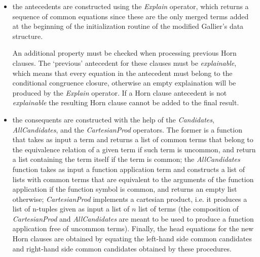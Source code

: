 \begin{itemize}
  \item the antecedents are constructed using the \emph{Explain} operator, 
    which returns a sequence of common equations since these are the 
    only merged terms added at the beginning of the initialization 
    routine of the modified Gallier's data structure.

    An additional property must be checked when processing previous
    Horn clauses. The `previous' antecedent for these clauses must be \emph{explainable},
    which means that every equation in the antecedent must belong to the conditional
    congruence closure, otherwise an empty explaination will be produced by the
    \emph{Explain} operator. If a Horn clause antecedent is not \emph{explainable}
    the resulting Horn clause cannot be added to the final result.

  \item the consequents are constructed with the help of the \emph{Candidates},
    \emph{AllCandidates}, and the \emph{CartesianProd} operators. 
    The former is a function that takes as input
    a term and returns a list of common terms
    that belong to the equivalence relation of a given term if such term is uncommon,
    and return a list containing the term itself if the term is common; the 
    \emph{AllCandidates} function takes as input a function application term and
    constructs a list of lists with common terms that are equivalent to the arguments
    of the function application if the function symbol is common, and returns an empty
    list otherwise; \emph{CartesianProd} implements a cartesian product, i.e. it 
    produces a list of n-tuples given as input a list of $n$ list of terms (the 
      composition of \emph{CartesianProd} and \emph{AllCandidates} are meant to be
    used to produce a function application free of uncommon terms). Finally, the
    head equations for the new Horn clauses are obtained by equating the left-hand
    side common candidates and right-hand side common candidates obtained by these 
    procedures.

\end{itemize}

